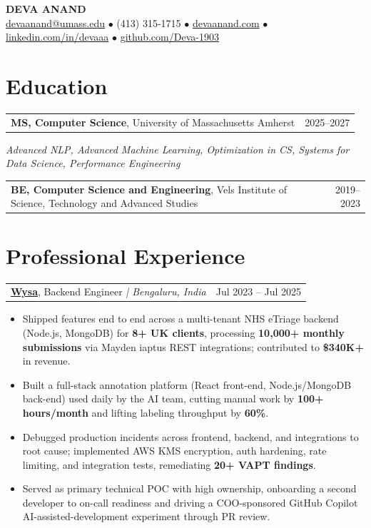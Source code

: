 \documentclass[letterpaper,11pt]{article}
\makeatletter
\newcommand{\eduItem}[3]{%
  \begin{tabular*}{\textwidth}{@{}l@{\extracolsep{\fill}}r@{}}
    \textbf{#1}, #2 & #3 \\
  \end{tabular*}\par
}
\newcommand{\expItem}[4]{%
  \vspace{2pt}
  \begin{tabular*}{\textwidth}{@{}l@{\extracolsep{\fill}}r@{}}
    \textbf{#1}, #2 \textit{| #3} & #4 \\
  \end{tabular*}\par\vspace{-2pt}
}
\makeatother
\begin{document}
\begin{center}
    {\fontsize{18}{20}\selectfont\bfseries DEVA ANAND}\\ \vspace{3pt}
    {\small
    \href{mailto:devaanand@umass.edu}{devaanand@umass.edu}
    \enspace$\bullet$\enspace
    (413) 315-1715
    \enspace$\bullet$\enspace
    \href{https://devaanand.com}{devaanand.com}
    \enspace$\bullet$\enspace
    \href{https://linkedin.com/in/devaaa/}{linkedin.com/in/devaaa}
    \enspace$\bullet$\enspace
    \href{https://github.com/Deva-1903}{github.com/Deva-1903}}
\end{center}
\vspace{-6pt}

\section{Education}
\eduItem{MS, Computer Science}{University of Massachusetts Amherst}{2025--2027}
{\small\textit{Advanced NLP, Advanced Machine Learning, Optimization in CS, Systems for Data Science, Performance Engineering}}\par
\vspace{3pt}
\eduItem{BE, Computer Science and Engineering}{Vels Institute of Science, Technology and Advanced Studies}{2019--2023}

\section{Professional Experience}

\expItem{\href{https://www.wysa.io}{Wysa}}{Backend Engineer}{Bengaluru, India}{Jul 2023 -- Jul 2025}
\begin{itemize}
  \item Shipped features end to end across a multi-tenant NHS eTriage backend (Node.js, MongoDB) for \textbf{8+ UK clients}, processing \textbf{10{,}000+ monthly submissions} via Mayden iaptus REST integrations; contributed to \textbf{\$340K+} in revenue.
  \item Built a full-stack annotation platform (React front-end, Node.js/MongoDB back-end) used daily by the AI team, cutting manual work by \textbf{100+ hours/month} and lifting labeling throughput by \textbf{60\%}.
  \item Debugged production incidents across frontend, backend, and integrations to root cause; implemented AWS KMS encryption, auth hardening, rate limiting, and integration tests, remediating \textbf{20+ VAPT findings}.
  \item Served as primary technical POC with high ownership, onboarding a second developer to on-call readiness and driving a COO-sponsored GitHub Copilot AI-assisted-development experiment through PR review.
\end{itemize}
\end{document}
